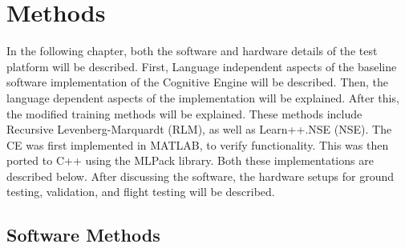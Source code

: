 \chapter{Methods}\label{ch:methods}
\par In the following chapter, both the software and hardware details of the test platform will be described. First, Language independent aspects of the baseline software implementation of the Cognitive Engine will be described. Then, the language dependent aspects of the implementation will be explained. After this, the modified training methods will be explained. These methods include Recursive Levenberg-Marquardt (RLM), as well as Learn++.NSE (NSE). The CE was first implemented in MATLAB, to verify functionality. This was then ported to C++ using the MLPack library. Both these implementations are described below. After discussing the software, the hardware setups for ground testing, validation, and flight testing will be described.
\section{Software Methods}

